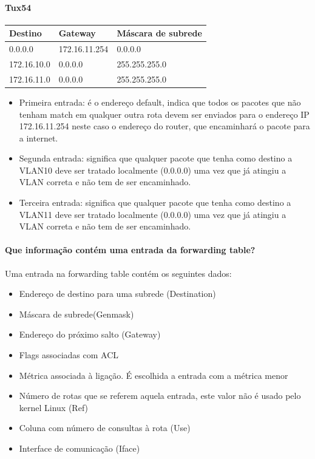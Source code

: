 \paragraph{Tux54}

\begin{center}
    \begin{tabular}{lll}
    \textbf Destino     & \textbf Gateway       & \textbf Máscara de subrede \\ \hline
    0.0.0.0     & 172.16.11.254 & 0.0.0.0            \\
    172.16.10.0 & 0.0.0.0       & 255.255.255.0      \\
    172.16.11.0 & 0.0.0.0       & 255.255.255.0     
    \end{tabular}
\end{center}

\begin{itemize}
    \item Primeira entrada: é o endereço default, indica que todos os pacotes que não tenham match em qualquer outra rota devem ser enviados para o endereço IP 172.16.11.254 neste caso o endereço do router, que encaminhará o pacote para a internet.
    \item Segunda entrada: significa que qualquer pacote que tenha como destino a VLAN10 deve ser tratado localmente (0.0.0.0) uma vez que já atingiu a VLAN correta e não tem de ser encaminhado.
    \item Terceira entrada: significa que qualquer pacote que tenha como destino a VLAN11 deve ser tratado localmente (0.0.0.0) uma vez que já atingiu a VLAN correta e não tem de ser encaminhado.
\end{itemize}

\paragraph{Que informação contém uma entrada da forwarding table?}

Uma entrada na forwarding table contém os seguintes dados:
\begin{itemize}
    \item Endereço de destino para uma subrede (Destination) 
    \item Máscara de subrede(Genmask)
    \item Endereço do próximo salto (Gateway)
    \item Flags associadas com ACL
    \item Métrica associada à ligação. É escolhida a entrada com a métrica menor
    \item Número de rotas que se referem aquela entrada, este valor não é usado pelo kernel Linux (Ref)
    \item Coluna com número de consultas à rota (Use)
    \item Interface de comunicação (Iface)
\end{itemize}


